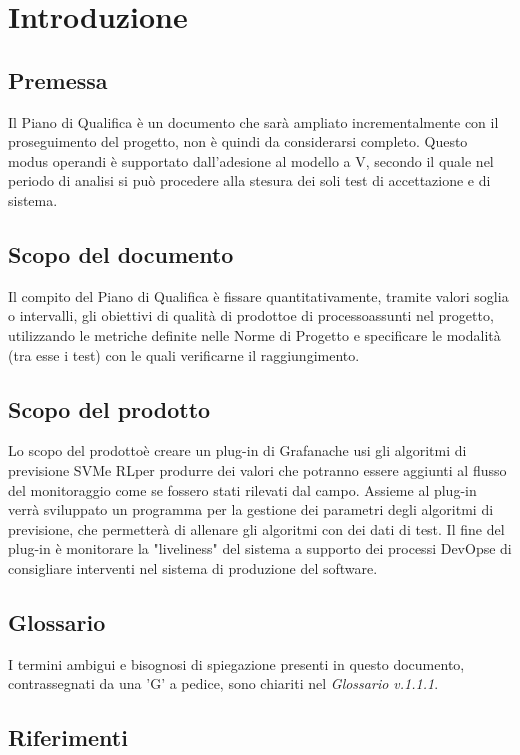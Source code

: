 \section{Introduzione}
	\subsection{Premessa}
	Il Piano di Qualifica è un documento che sarà ampliato incrementalmente con il proseguimento del progetto\glo, non è quindi da considerarsi completo. Questo modus operandi è supportato dall'adesione al modello a V\glo, secondo il quale nel periodo di analisi si può procedere alla stesura dei soli test di accettazione e di sistema.
	
	\subsection{Scopo del documento}
	Il compito del Piano di Qualifica è fissare quantitativamente, tramite valori soglia o intervalli, gli obiettivi di qualità di prodotto\glosp e di processo\glosp assunti nel progetto\glo, utilizzando le metriche definite nelle Norme di Progetto e specificare le modalità (tra esse i test) con le quali verificarne il raggiungimento.

	\subsection{Scopo del prodotto\glo}
	Lo scopo del prodotto\glosp è creare un plug-in di Grafana\glosp che usi gli algoritmi di previsione SVM\glosp e RL\glosp per produrre dei valori che potranno essere aggiunti al flusso del monitoraggio come se fossero stati rilevati dal campo. Assieme al plug-in verrà sviluppato un programma per la gestione dei parametri degli algoritmi di previsione, che permetterà di allenare gli algoritmi con dei dati di test. Il fine del plug-in è monitorare la "liveliness" del sistema a supporto dei processi DevOps\glosp e di consigliare interventi nel sistema di produzione del software.
	
	\subsection{Glossario}
	I termini ambigui e bisognosi di spiegazione presenti in questo documento, contrassegnati da una 'G' a pedice, sono chiariti nel \textit{Glossario v.1.1.1}.
	
	\subsection{Riferimenti}
